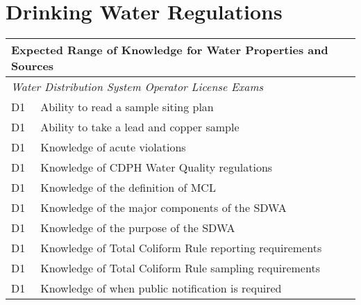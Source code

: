 
\chapter{Drinking Water Regulations}

\begin{table}[H]
\begin{tabular}{| m{1cm} | m{15cm} |}
\hline
\multicolumn{2}{|l|}{\textbf{Expected   Range of Knowledge for Water Properties and Sources}}                                                                          \\ \hline
\multicolumn{2}{|l|}{\textit{Water   Distribution System Operator License Exams}}                                                                                      \\ \hline
D1 & Ability to read   a sample siting plan                                                                                    \\ \hline
D1 & Ability to take a   lead and copper sample                                                                                \\ \hline
D1 & Knowledge of acute   violations                                                                                           \\ \hline
D1 & Knowledge of CDPH   Water Quality regulations                                                                             \\ \hline
D1 & Knowledge of the   definition of MCL                                                                                      \\ \hline
D1 & Knowledge of the   major components of the SDWA                                                                           \\ \hline
D1 & Knowledge of the   purpose of the SDWA                                                                                    \\ \hline
D1 & Knowledge of Total   Coliform Rule reporting requirements                                                                 \\ \hline
D1 & Knowledge of Total   Coliform Rule sampling requirements                                                                  \\ \hline
D1 & Knowledge of when   public notification is required                                                                       \\ \hline

\end{tabular}
\end{table}
